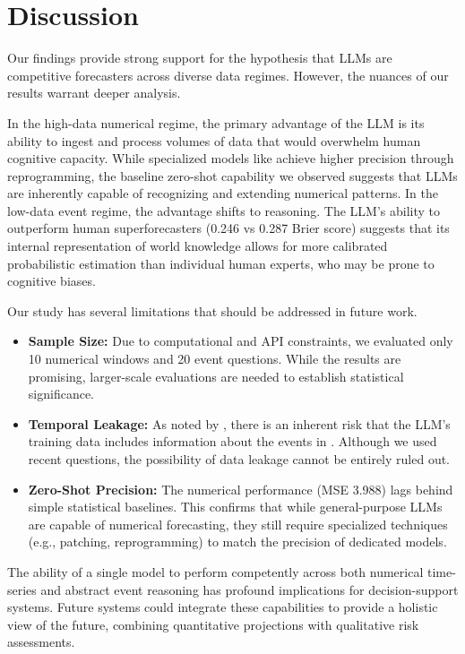 \section{Discussion}

Our findings provide strong support for the hypothesis that LLMs are competitive forecasters across diverse data regimes. However, the nuances of our results warrant deeper analysis.

 In the high-data numerical regime, the primary advantage of the LLM is its ability to ingest and process volumes of data that would overwhelm human cognitive capacity. While specialized models like \timellm achieve higher precision through reprogramming, the baseline zero-shot capability we observed suggests that LLMs are inherently capable of recognizing and extending numerical patterns. In the low-data event regime, the advantage shifts to reasoning. The LLM's ability to outperform human superforecasters (0.246 vs 0.287 Brier score) suggests that its internal representation of world knowledge allows for more calibrated probabilistic estimation than individual human experts, who may be prone to cognitive biases.

 Our study has several limitations that should be addressed in future work.
\begin{itemize}[leftmargin=*,itemsep=0pt,topsep=0pt]
    \item {\bf Sample Size:} Due to computational and API constraints, we evaluated only 10 numerical windows and 20 event questions. While the results are promising, larger-scale evaluations are needed to establish statistical significance.
    \item {\bf Temporal Leakage:} As noted by \citet{paleka2025pitfalls}, there is an inherent risk that the LLM's training data includes information about the events in \forecastbench. Although we used recent questions, the possibility of data leakage cannot be entirely ruled out.
    \item {\bf Zero-Shot Precision:} The numerical performance (MSE 3.988) lags behind simple statistical baselines. This confirms that while general-purpose LLMs are capable of numerical forecasting, they still require specialized techniques (e.g., patching, reprogramming) to match the precision of dedicated models.
\end{itemize}

 The ability of a single model to perform competently across both numerical time-series and abstract event reasoning has profound implications for decision-support systems. Future systems could integrate these capabilities to provide a holistic view of the future, combining quantitative projections with qualitative risk assessments.
